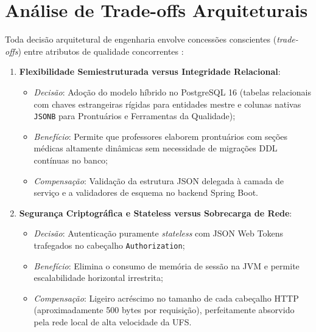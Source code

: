 \section{Análise de Trade-offs Arquiteturais}
\label{sec_tradeoffs}

Toda decisão arquitetural de engenharia envolve concessões conscientes (\textit{trade-offs}) entre atributos de qualidade concorrentes \cite{bass2021,richards2020}:

\begin{enumerate}
    \item \textbf{Flexibilidade Semiestruturada versus Integridade Relacional}:
    \begin{itemize}
        \item \textit{Decisão}: Adoção do modelo híbrido no PostgreSQL 16 (tabelas relacionais com chaves estrangeiras rígidas para entidades mestre e colunas nativas \texttt{JSONB} para Prontuários e Ferramentas da Qualidade);
        \item \textit{Benefício}: Permite que professores elaborem prontuários com seções médicas altamente dinâmicas sem necessidade de migrações DDL contínuas no banco;
        \item \textit{Compensação}: Validação da estrutura JSON delegada à camada de serviço e a validadores de esquema no backend Spring Boot.
    \end{itemize}

    \item \textbf{Segurança Criptográfica e Stateless versus Sobrecarga de Rede}:
    \begin{itemize}
        \item \textit{Decisão}: Autenticação puramente \textit{stateless} com JSON Web Tokens trafegados no cabeçalho \texttt{Authorization};
        \item \textit{Benefício}: Elimina o consumo de memória de sessão na JVM e permite escalabilidade horizontal irrestrita;
        \item \textit{Compensação}: Ligeiro acréscimo no tamanho de cada cabeçalho HTTP (aproximadamente 500 bytes por requisição), perfeitamente absorvido pela rede local de alta velocidade da UFS.
    \end{itemize}


\end{enumerate}
